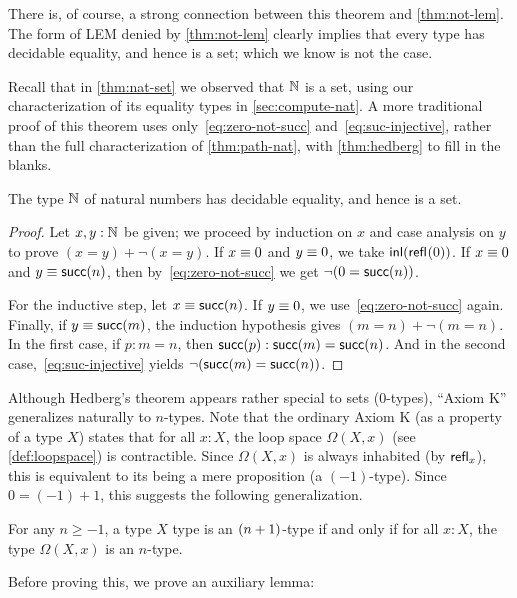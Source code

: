 There is, of course, a strong connection between this theorem and \autoref{thm:not-lem}.
The form of LEM denied by \autoref{thm:not-lem} clearly implies that every type has decidable equality, and hence is a set; which we know is
not the case.

Recall that in \autoref{thm:nat-set} we observed that $\mathbb{N}$ is a set, using our characterization of its equality types in
\autoref{sec:compute-nat}.
A more traditional proof of this theorem uses only~\eqref{eq:zero-not-succ} and~\eqref{eq:suc-injective}, rather than the full
characterization of \autoref{thm:path-nat}, with \autoref{thm:hedberg} to fill in the blanks.

\begin{thm}\label{prop:nat-is-set}
 The type $\mathbb{N}$ of natural numbers has decidable equality, and hence is a set.
\end{thm}

\begin{proof}
  Let $x, y : \mathbb{N}$ be given; we proceed by induction on $x$ and case analysis on $y$ to prove $(x=y)+\neg(x=y)$.
  If $x \equiv 0$ and $y \equiv 0$, we take ${\mathsf{inl}}(\mathsf{refl}_{}(0))$.
  If $x \equiv 0$ and $y \equiv \mathsf{succ}(n)$, then by~\eqref{eq:zero-not-succ} we get $\neg (0 = \mathsf{succ} (n))$.

  For the inductive step, let $x \equiv \mathsf{succ} (n)$.
  If $y \equiv 0$, we use~\eqref{eq:zero-not-succ} again.
  Finally, if $y \equiv \mathsf{succ} (m)$, the induction hypothesis gives $(m = n)+\neg(m = n)$.
  In the first case, if $p:m=n$, then ${\mathsf{succ}}\mathopen{}\left({p}\right)\mathclose{}:\mathsf{succ}(m)=\mathsf{succ}(n)$.
  And in the second case,~\eqref{eq:suc-injective} yields $\neg(\mathsf{succ}(m)=\mathsf{succ}(n))$.
\end{proof}

Although Hedberg's theorem appears rather special to sets ($0$-types), ``Axiom K'' generalizes naturally to $n$-types.
Note that the ordinary Axiom K (as a property of a type $X$) states that for all $x:X$, the loop space $\Omega(X,x)$ (see \cref{def:loopspace}) is contractible.
Since $\Omega(X,x)$ is always inhabited (by $\mathsf{refl}_{x}$), this is equivalent to its being a mere proposition (a $(-1)$-type).
Since $0 = (-1)+1$, this suggests the following generalization.

\begin{thm}\label{thm:hlevel-loops}
  For any $n\geq -1$, a type $X$ type is an $(n+1)$-type if and only if for all $x : X$, the type $\Omega(X, x)$ is an $n$-type.
\end{thm}

Before proving this, we prove an auxiliary lemma:

